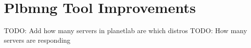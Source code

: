 \chapter{Plbmng Tool Improvements}
\label{chapter:improve}
TODO: Add how many servers in planetlab are which distros
TODO: How many servers are responding